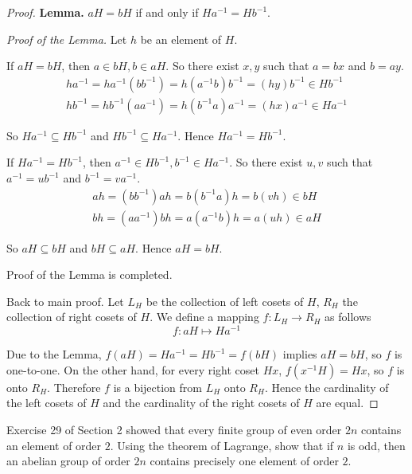 \begin{proof}
    \textbf{Lemma.} $aH = bH$ if and only if $Ha^{-1} = Hb^{-1}$.

    \textit{Proof of the Lemma.} Let $h$ be an element of $H$.

    If $aH = bH$, then $a\in bH, b\in aH$. So there exist $x, y$ such that $a = bx$ and $b = ay$.
    \[
        \begin{split}
            ha^{-1} = ha^{-1}(bb^{-1}) = h(a^{-1}b)b^{-1} = (hy)b^{-1} \in Hb^{-1} \\
            hb^{-1} = hb^{-1}(aa^{-1}) = h(b^{-1}a)a^{-1} = (hx)a^{-1} \in Ha^{-1}
        \end{split}
    \]

    So $Ha^{-1}\subseteq Hb^{-1}$ and $Hb^{-1}\subseteq Ha^{-1}$. Hence $Ha^{-1} = Hb^{-1}$.

    If $Ha^{-1} = Hb^{-1}$, then $a^{-1}\in Hb^{-1}, b^{-1}\in Ha^{-1}$. So there exist $u, v$ such that $a^{-1} = ub^{-1}$ and $b^{-1} = va^{-1}$.
    \[
        \begin{split}
            ah = (bb^{-1})ah = b(b^{-1}a)h = b(vh) \in bH \\
            bh = (aa^{-1})bh = a(a^{-1}b)h = a(uh) \in aH
        \end{split}
    \]

    So $aH\subseteq bH$ and $bH\subseteq aH$. Hence $aH = bH$.

    Proof of the Lemma is completed.

    Back to main proof. Let $L_{H}$ be the collection of left cosets of $H$, $R_{H}$ the collection of right cosets of $H$. We define a mapping $f: L_{H}\to R_{H}$ as follows
    \[
        f: aH \mapsto Ha^{-1}
    \]

    Due to the Lemma, $f(aH) = Ha^{-1} = Hb^{-1} = f(bH)$ implies $aH = bH$, so $f$ is one-to-one. On the other hand, for every right coset $Hx$, $f(x^{-1}H) = Hx$, so $f$ is onto $R_{H}$. Therefore $f$ is a bijection from $L_{H}$ onto $R_{H}$. Hence the cardinality of the left cosets of $H$ and the cardinality of the right cosets of $H$ are equal.
\end{proof}

\begin{exercise}
    Exercise 29 of Section 2 showed that every finite group of even order $2n$ contains an element of order $2$. Using the theorem of Lagrange, show that if $n$ is odd, then an abelian group of order $2n$ contains precisely one element of order $2$.
\end{exercise}

